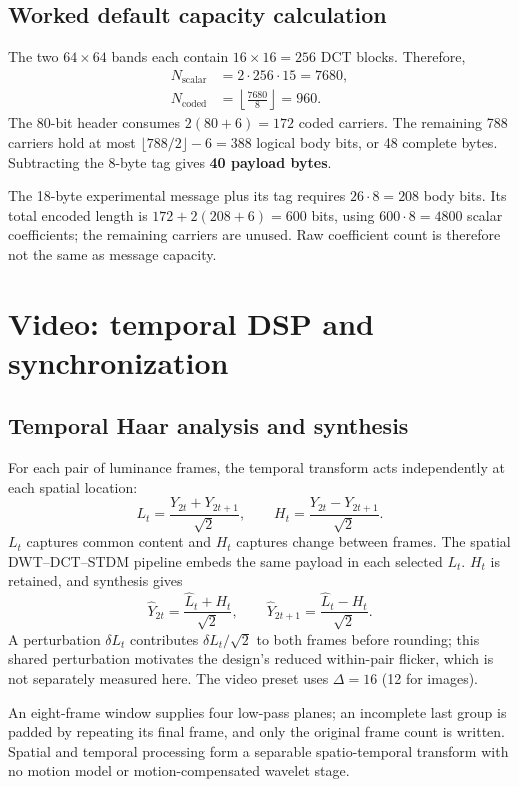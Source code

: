\documentclass[11pt,a4paper]{article}
\begin{document}
\subsection{Worked default capacity calculation}
The two $64\times64$ bands each contain $16\times16=256$ DCT blocks. Therefore,
\begin{align}
N_{\mathrm{scalar}}&=2\cdot256\cdot15=7680,\\
N_{\mathrm{coded}}&=\left\lfloor\frac{7680}{8}\right\rfloor=960.
\end{align}
The 80-bit header consumes $2(80+6)=172$ coded carriers. The remaining 788 carriers
hold at most $\lfloor788/2\rfloor-6=388$ logical body bits, or 48 complete bytes.
Subtracting the 8-byte tag gives \textbf{40 payload bytes}.

The 18-byte experimental message plus its tag requires $26\cdot8=208$ body bits.
Its total encoded length is $172+2(208+6)=600$ bits, using $600\cdot8=4800$ scalar
coefficients; the remaining carriers are unused. Raw coefficient count is therefore
not the same as message capacity.

\section{Video: temporal DSP and synchronization}
\subsection{Temporal Haar analysis and synthesis}
For each pair of luminance frames, the temporal transform acts independently at
each spatial location:
\begin{equation}
L_t=\frac{Y_{2t}+Y_{2t+1}}{\sqrt{2}},\qquad
H_t=\frac{Y_{2t}-Y_{2t+1}}{\sqrt{2}}.
\end{equation}
$L_t$ captures common content and $H_t$ captures change between frames. The spatial
DWT--DCT--STDM pipeline embeds the same payload in each selected $L_t$. $H_t$ is
retained, and synthesis gives
\begin{equation}
\widehat{Y}_{2t}=\frac{\widehat{L}_t+H_t}{\sqrt{2}},\qquad
\widehat{Y}_{2t+1}=\frac{\widehat{L}_t-H_t}{\sqrt{2}}.
\end{equation}
A perturbation $\delta L_t$ contributes $\delta L_t/\sqrt{2}$ to both frames before
rounding; this shared perturbation motivates the design's reduced within-pair
flicker, which is not separately measured here. The video preset uses $\Delta=16$
(12 for images).

An eight-frame window supplies four low-pass planes; an incomplete last group is
padded by repeating its final frame, and only the original frame count is written.
Spatial and temporal processing form a separable spatio-temporal transform with no
motion model or motion-compensated wavelet stage.
\end{document}
